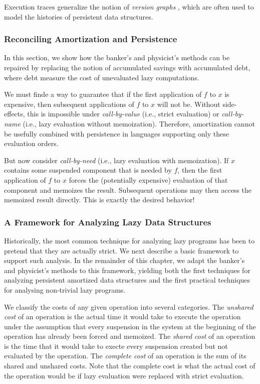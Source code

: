 \documentclass[12pt, a4paper]{article} %
\begin{document}
Execution traces generalize the notion of \textit{version graphs} \cite{dsst89}, which are often used to model the histories of persistent data structures.

\subsubsection{Reconciling Amortization and Persistence}%

In this section, we show how the banker's and physicist's methods can be repaired by replacing the notion of accumulated savings with accumulated debt, where debt measure the cost of unevaluated lazy computations.

We must finde a way to guarantee that if the first application of $f$ to $x$ is expensive, then subsequent applications of $f$ to $x$ will not be. Without side-effects, this is impossible under \mbox{\textit{call-by-value}} (i.e., strict evaluation) or \mbox{\textit{call-by-name}} (i.e., lazy evaluation without memoization). Therefore, amortization cannot be usefully combined with persistence in languages supporting only these evaluation orders.

But now consider \mbox{\textit{call-by-need}} (i.e., lazy evaluation with memoization). If $x$ contains some suspended component that is needed by $f$, then the first application of $f$ to $x$ forces the (potentially expensive) evaluation of that component and memoizes the result. Subsequent operations may then access the memoized result directly. This is exactly the desired behavior!

\subsubsection{A Framework for Analyzing Lazy Data Structures}%
\label{ssub:A Framework for Analyzing Lazy Data Structures}

Historically, the most common technique for analyzing lazy programs has been to pretend that they are actually strict. We next describe a basic framework to support such analysis. In the remainder of this chapter, we adapt the banker's and physicist's methods to this framework, yielding both the first techniques for analyzing persistent amortized data structures and the first practical techniques for analysing non-trivial lazy programs.


We classify the costs of any given operation into several categories. The \textit{unshared cost} of an operation is the actual time it would take to execute the operation under the assumption that every suspension in the system at the beginning of the operation has already been forced and memoized. The \textit{shared cost} of an operation is the time that it would take to execte every suspension created but not evaluated by the operation. The \textit{complete cost} of an operation is the sum of its shared and unshared costs. Note that the complete cost is what the actual cost of the operation would be if lazy evaluation were replaced with strict evaluation.
\end{document}
